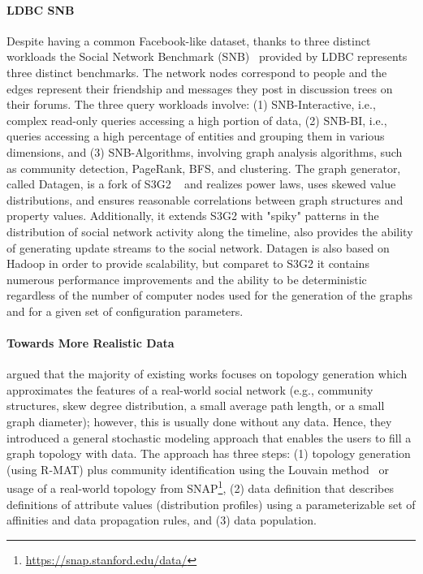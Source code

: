 \paragraph{LDBC SNB} Despite having a common Facebook-like dataset, thanks to
three distinct workloads the Social Network Benchmark
(SNB)~\cite{Erling:2015:LSN:2723372.2742786} provided by LDBC represents three
distinct benchmarks. The network nodes correspond to people and the edges
represent their friendship and messages they post in discussion trees on their
forums. The three query workloads involve: (1) SNB-Interactive, i.e., complex
read-only queries accessing a high portion of data, (2) SNB-BI, i.e.,
queries accessing a high percentage of  entities and grouping them in various
dimensions, and (3) SNB-Algorithms, involving graph analysis algorithms, such as
community detection, PageRank, BFS, and clustering. The graph generator, called
Datagen, is a fork of S3G2 ~\cite{Pham2013} and realizes power laws, uses skewed
value distributions, and ensures reasonable correlations between graph
structures and property values. Additionally, it extends S3G2 with "spiky"
patterns in the distribution of social network activity along the timeline, also
provides the ability of generating update streams to the social network. Datagen
is also based on Hadoop in order to provide scalability, but comparet to S3G2 it
contains numerous performance improvements and the ability to be deterministic
regardless of the number of computer nodes used for the generation of the graphs
and for a given set of configuration parameters.


\paragraph{Towards More Realistic Data} \cite{Nettleton2016} argued that the majority of existing works focuses on
topology generation which approximates the features of a real-world social
network (e.g., community structures, skew degree
distribution, a small average path length, or a small graph diameter); however,  this is usually done without any data. Hence, they
introduced a general stochastic modeling approach that enables the users to
fill a graph topology with data. The approach has three steps: (1) topology
generation (using R-MAT) plus community identification using the Louvain
method~\cite{1742-5468-2008-10-P10008} or usage of a real-world topology from
SNAP\footnote{\url{https://snap.stanford.edu/data/}}, (2) data definition
that describes  definitions of attribute values (distribution profiles) using a
parameterizable set of affinities and data propagation rules, and (3) data
population.

